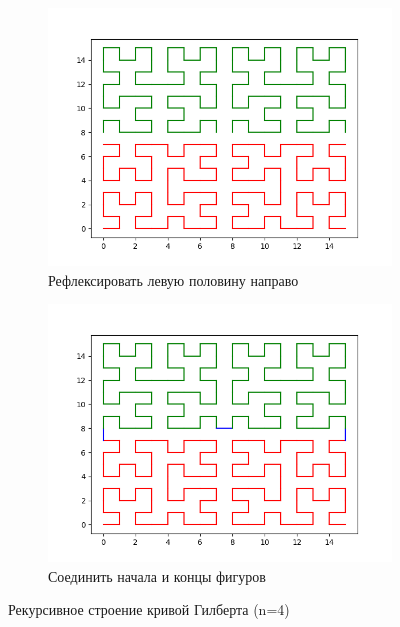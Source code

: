 \documentclass[12pt]{article} %
\begin{document}
\begin{figure}[H]
\begin{subfigure}[1]{0.45\textwidth}
\centering \includegraphics[width = \textwidth]{hilbert4step3.png}
\caption{Рефлексировать левую половину направо}
\end{subfigure}
\hfill
\begin{subfigure}[1]{0.45\textwidth}
\centering \includegraphics[width = \textwidth]{hilbert4step4.png}
\caption{Соединить начала и концы фигуров}
\end{subfigure}
\caption{Рекурсивное строение кривой Гилберта (n=4)}
\end{figure}


\newpage
\inputminted[firstline = 59, lastline = 87, frame= single, breaklines]{Haskell}{F:/git/FuncProg/Assignment1/Assign1.hs}
\newpage
\end{document}
